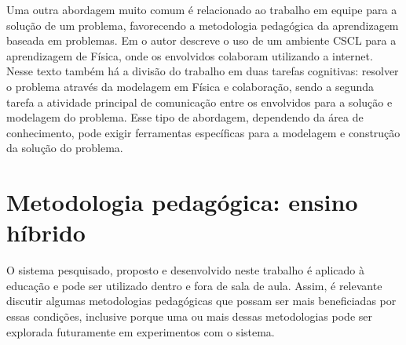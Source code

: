 
Uma outra abordagem muito comum é relacionado ao trabalho em equipe para a solução de um problema, favorecendo a metodologia pedagógica da aprendizagem baseada em problemas. Em  o autor descreve o uso de um ambiente CSCL para a aprendizagem de Física, onde os envolvidos colaboram utilizando a internet. Nesse texto também há a divisão do trabalho em duas tarefas cognitivas: resolver o problema através da modelagem em Física e colaboração, sendo a segunda tarefa a atividade principal de comunicação entre os envolvidos para a solução e modelagem do problema. Esse tipo de abordagem, dependendo da área de conhecimento, pode exigir ferramentas específicas para a modelagem e construção da solução do problema.



\section{Metodologia pedagógica: ensino híbrido}
\label{sec:flipped}


O sistema pesquisado, proposto e desenvolvido neste trabalho é aplicado à educação e pode ser utilizado dentro e fora de sala de aula. Assim, é relevante discutir algumas metodologias pedagógicas que possam ser mais beneficiadas por essas condições, inclusive porque uma ou mais dessas metodologias pode ser explorada futuramente em experimentos com o sistema.


